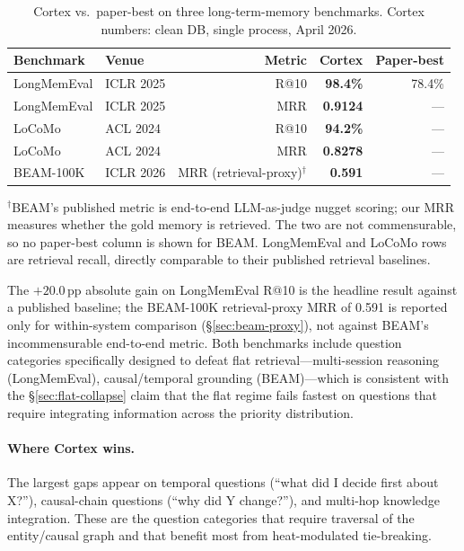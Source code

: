 \documentclass[11pt]{article}
\begin{document}
\begin{table}[t]
\centering
\caption{Cortex vs.\ paper-best on three long-term-memory benchmarks.
Cortex numbers: clean DB, single process, April 2026.}
\label{tab:benchmarks}
\begin{tabular}{llrrr}
\toprule
Benchmark & Venue & Metric & Cortex & Paper-best \\
\midrule
LongMemEval & ICLR 2025 & R@10    & \textbf{98.4\%} & 78.4\% \\
LongMemEval & ICLR 2025 & MRR     & \textbf{0.9124} & ---    \\
LoCoMo      & ACL 2024  & R@10    & \textbf{94.2\%} & ---    \\
LoCoMo      & ACL 2024  & MRR     & \textbf{0.8278} & ---    \\
BEAM-100K   & ICLR 2026 & MRR (retrieval-proxy)$^\dagger$ & \textbf{0.591}  & ---    \\
\bottomrule
\end{tabular}

\vspace{2pt}
{\footnotesize $^\dagger$BEAM's published metric is end-to-end
LLM-as-judge nugget scoring; our MRR measures whether the gold
memory is retrieved.  The two are not commensurable, so no
paper-best column is shown for BEAM.  LongMemEval and LoCoMo rows
are retrieval recall, directly comparable to their published
retrieval baselines.}
\end{table}

The $+20.0$\,pp absolute gain on LongMemEval R@10 is the headline
result against a published baseline; the BEAM-100K retrieval-proxy
MRR of 0.591 is reported only for within-system comparison
(\S\ref{sec:beam-proxy}), not against BEAM's incommensurable
end-to-end metric.  Both benchmarks include question categories
specifically designed to
defeat flat retrieval---multi-session reasoning (LongMemEval),
causal/temporal grounding (BEAM)---which is consistent with the
\S\ref{sec:flat-collapse} claim that the flat regime fails fastest
on questions that require integrating information across the
priority distribution.

\paragraph{Where Cortex wins.}
The largest gaps appear on temporal questions (``what did I decide
first about X?''), causal-chain questions (``why did Y change?''),
and multi-hop knowledge integration.  These are the question
categories that require traversal of the entity/causal graph and
that benefit most from heat-modulated tie-breaking.
\end{document}
